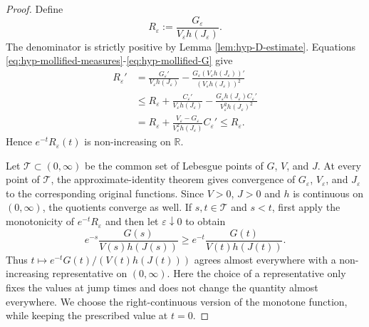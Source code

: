 \documentclass[11pt,reqno]{amsart}
\numberwithin{equation}{section}
\theoremstyle{definition}
\begin{document}
\begin{proof}
Define
\begin{equation*}
    R_\varepsilon
    :=\frac{G_\varepsilon}{V_\varepsilon h(J_\varepsilon)}.
\end{equation*}
The denominator is strictly positive by Lemma
\ref{lem:hyp-D-estimate}. Equations \eqref{eq:hyp-mollified-measures}-\eqref{eq:hyp-mollified-G} give
\begin{align*}
    R_\varepsilon'
    &=\frac{G_\varepsilon'}{V_\varepsilon h(J_\varepsilon)}
      -\frac{G_\varepsilon \left( V_\varepsilon h(J_\varepsilon) \right)'}{\left( V_\varepsilon h(J_\varepsilon) \right)^2}\\
    &\leq R_\varepsilon
      +\frac{C_\varepsilon'}{V_\varepsilon h(J_\varepsilon)}
      -\frac{G_\varepsilon h(J_\varepsilon)C_\varepsilon'}
       {V_\varepsilon^2h(J_\varepsilon)^2}\\
    &=R_\varepsilon
      +\frac{V_\varepsilon-G_\varepsilon}
       {V_\varepsilon^2h(J_\varepsilon)}C_\varepsilon'
    \leq R_\varepsilon.
\end{align*}
Hence $e^{-t}R_\varepsilon(t)$ is non-increasing on $\mathbb R$.

Let $\mathcal T\subset(0,\infty)$ be the common set of Lebesgue points of $G$, $V$, and $J$.  At every point of $\mathcal T$, the approximate-identity theorem gives convergence of $G_\varepsilon$, $V_\varepsilon$, and $J_\varepsilon$ to the corresponding original functions.  Since $V>0$, $J>0$ and $h$ is continuous on $(0,\infty)$, the quotients converge as well. If $s,t\in\mathcal T$ and $s<t$, first apply the monotonicity of $e^{-t}R_\varepsilon$ and then let $\varepsilon\downarrow0$ to obtain
\begin{equation*}
    e^{-s}\frac{G(s)}{V(s)h(J(s))}
    \geq
    e^{-t}\frac{G(t)}{V(t)h(J(t))}.
\end{equation*}
Thus $t\mapsto e^{-t}G(t)/(V(t)h(J(t)))$ agrees almost everywhere with a non-increasing representative on $(0,\infty)$. Here the choice of a representative only fixes the values at jump times and does not change the quantity almost everywhere. We choose the right-continuous version of the monotone function, while keeping the prescribed value at $t=0$. 


\end{proof}
\end{document}
